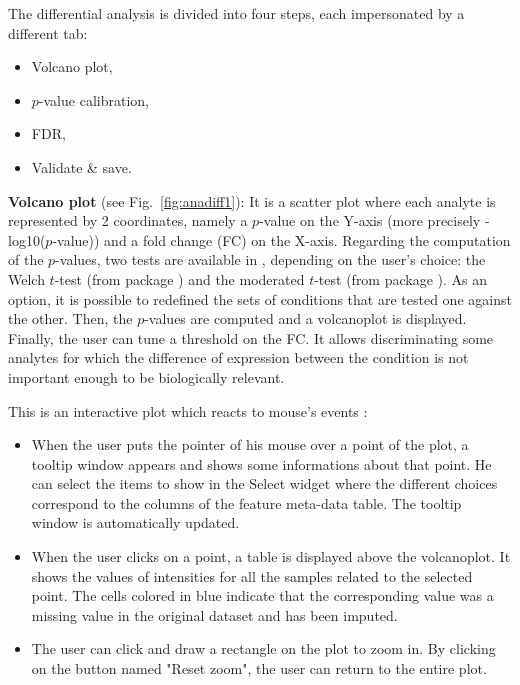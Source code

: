 \documentclass[12pt]{article}
\begin{document}
{The differential analysis is divided into four steps, each impersonated by a 
different tab:
\begin{itemize}
\item Volcano plot,
\item $p$-value calibration,
\item FDR,
\item Validate \& save.
\end{itemize}}


\textbf {Volcano plot} (see Fig.~\ref{fig:anadiff1}): It is a scatter plot 
where each analyte is represented by 2 coordinates, namely a $p$-value on the 
Y-axis (more precisely -log10($p$-value)) and a fold change (FC) on the 
X-axis. Regarding the computation of the $p$-values, two tests are available 
in , depending on the user's choice: the Welch $t$-test 
(from package ) and the moderated $t$-test (from package 
).
As an option, it is possible to redefined the sets of conditions that are 
tested one against the other. 
Then, the $p$-values are computed and a volcanoplot is displayed. 
Finally, the user can tune a threshold on the FC. It allows discriminating 
some analytes for which the difference of expression between the condition is 
not important enough to be biologically relevant.

This is an interactive plot which reacts to mouse's events :
\begin{itemize}
\item When the user puts the pointer of his mouse over a
point of the plot, a tooltip window appears and shows some informations about 
that point. He can select the items to show in the Select widget where the 
different choices correspond to the columns of the feature meta-data table. 
The tooltip window is automatically updated.
\item When the user clicks on a point, a table is displayed above the 
volcanoplot. It shows the values of intensities for all the samples related to
the selected point. The cells colored in blue indicate that the corresponding 
value was a missing value in the original dataset and has been imputed.
\item The user can click and draw a rectangle on the plot to zoom in. 
By clicking on the button named "Reset zoom", the user can return to the 
entire plot.
\end{itemize}
\end{document}
